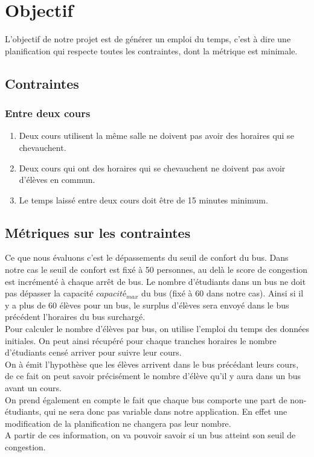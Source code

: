\documentclass[a4paper,11pt]{article}
\begin{document}
\section{Objectif}
	L'objectif de notre projet est de générer un emploi du temps, c'est à dire une planification qui respecte toutes les contraintes, dont la métrique est minimale.
	\subsection{Contraintes}
		\subsubsection{Entre deux cours}
				\begin{enumerate}
					\item Deux cours utilisent la même salle ne doivent pas avoir des horaires qui se chevauchent.
					\item Deux cours qui ont des horaires qui se chevauchent ne doivent pas avoir d'élèves en commun.
					\item Le temps laissé entre deux cours doit être de 15 minutes minimum.
				\end{enumerate}
	
	\subsection{Métriques sur les contraintes}
		Ce que nous évaluons c'est le dépassements du seuil de confort du bus. Dans notre cas le seuil de confort est fixé à 50 personnes, au delà le score de congestion est incrémenté à chaque arrêt de bus.
		Le nombre d'étudiants dans un bus ne doit pas dépasser la capacité $capacité_{max}$ du bus (fixé à 60 dans notre cas). Ainsi si il y a plus de 60 élèves pour un bus, le surplus d'élèves sera envoyé dans le bus précédent l'horaires du bus surchargé.\\
		Pour calculer le nombre d'élèves par bus, on utilise l'emploi du temps des données initiales. On peut ainsi récupéré pour chaque tranches horaires le nombre d'étudiants censé arriver pour suivre leur cours.\\
		On à émit l'hypothèse que les élèves arrivent dans le bus précédant leurs cours, de ce fait on peut savoir précisément le nombre d'élève qu'il y aura dans un bus avant un cours.\\
		On prend également en compte le fait que chaque bus comporte une part de non-étudiants, qui ne sera donc pas variable dans notre application. En effet une modification de la planification ne changera pas leur nombre.\\
		A partir de ces information, on va pouvoir savoir si un bus atteint son seuil de congestion.
		
\end{document}
